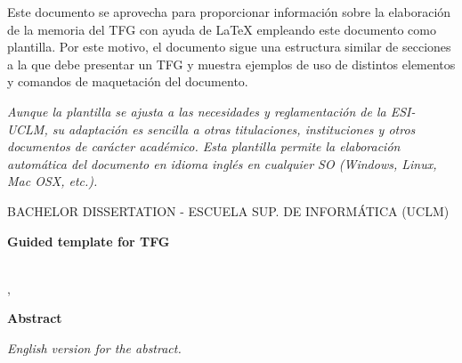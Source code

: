 Este documento se aprovecha para proporcionar información sobre la elaboración de la memoria del TFG con ayuda de \LaTeX{} empleando este documento como plantilla. Por este motivo, el documento sigue una estructura similar de secciones a la que debe presentar un TFG y muestra ejemplos de uso de distintos elementos y comandos de maquetación del documento.

\emph{Aunque la plantilla se ajusta a las necesidades y reglamentación de la ESI-UCLM, su adaptación es sencilla a otras titulaciones, instituciones y otros documentos de carácter académico. Esta plantilla permite la elaboración automática del documento en idioma inglés en cualquier SO (Windows, Linux, Mac OSX, etc.).}


\cleardoublepage %





\makeatletter
\begin{center} %
   {\textsc{BACHELOR DISSERTATION - ESCUELA SUP. DE INFORMÁTICA (UCLM)}\par}
   \vspace{1cm} %
   {\textbf{\Large Guided template for TFG}\par}
   \vspace{0.4cm} %
   {\@autor \\ \@cityTF,{} \@monthTF{} \@yearTF\par} 
   \vspace{0.9cm} %
   {\textbf{\large\textsf{Abstract}}\par} 
\end{center}   
\makeatother %
\emph{English version for the abstract.}
\cleardoublepage %

